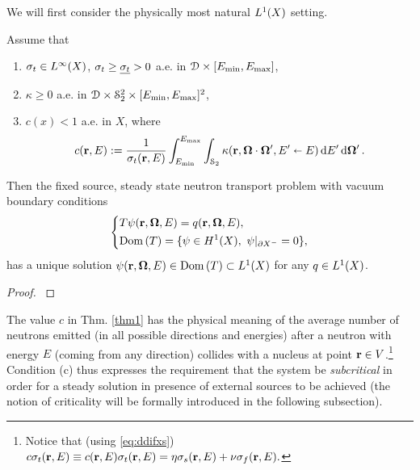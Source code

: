 We will first consider the physically most natural $\Lp[1](X)$ setting.
\begin{theorem}\label{thm1}
Assume that
\begin{enumerate}[label=(\alph*)]
	\item $\sigma_t \in \Lp[\infty](X)$, $\sigma_t \geq \mst > 0$ a.e. in $\VV\times[\Emin,\Emax]$,
	\item $\kappa \geq 0$ a.e. in $\VV\times\Sphere^2\times[\Emin,\Emax]^2$,
	\item $\displaystyle c(x) < 1$ a.e. in $X$, where
	  \begin{equation}\label{eq:c}
	    c(\br,E) := \frac{1}{\sigma_t(\br,E)}\int_{\Emin}^{\Emax}\int_{\Sphere} \kappa(\br,\bomega\cdot\bomega',
	    E'\sla E)\,\d{E'}\d{\bomega'}.
	  \end{equation}
\end{enumerate}
Then the fixed source, steady state neutron transport problem with vacuum boundary conditions 
\begin{equation*}
  \left\{
  \begin{aligned}
     &T\psi(\br,\bomega,E) = q(\br,\bomega,E),\\
     &\Dom{T} = \{\psi\in \Hp[1](X),\ \psi\vert_{\pX[-]} = 0\},
  \end{aligned}
  \right.
\end{equation*}
has a unique solution $\psi(\br,\bomega,E)\in\Dom{T}\subset\Lp[1](X)$ for any $q\in \Lp[1](X)$.
\end{theorem}
\begin{proof}
\cite[Chap. XXI, \S 2, Proposition 5]{DautrayLions}
\end{proof}

The value $c$ in Thm. \ref{thm1} has the physical meaning of the average number of neutrons emitted (in all possible
directions and energies) after a neutron with energy $E$ (coming from any direction) collides with a nucleus at point
$\br\in V$.\footnote{\label{ftn:c}Notice that (using \eqref{eq:ddifxs})
$
	c\sigma_t(\br,E)\equiv c(\br,E)\sigma_t(\br,E) = \eta\sigma_s(\br,E) + \nu\sigma_f(\br,E).
$}
Condition (c) thus expresses the requirement that the system be \textit{subcritical} in order for a
steady solution in presence of external sources to be achieved (the notion of criticality will be formally introduced in the following
subsection).

